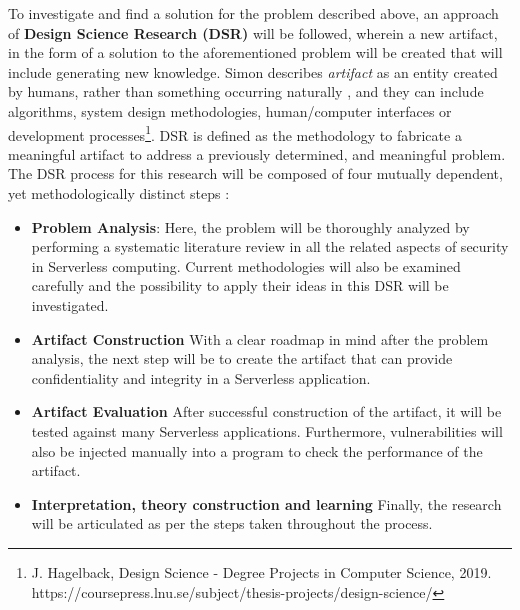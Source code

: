 To investigate and find a solution for the problem described above, an approach of \textbf{Design Science Research (DSR)} \cite{March1995} will be followed, wherein a new artifact, in the form of a solution to the aforementioned problem will be created that will include generating new knowledge. Simon describes \textit{artifact} as an entity created by humans, rather than something occurring naturally \cite{Simon1996}, and they can include algorithms, system design methodologies, human/computer interfaces or development processes\footnote{J. Hagelback, Design Science - Degree Projects in Computer Science, 2019. https://coursepress.lnu.se/subject/thesis-projects/design-science/}. DSR is defined as the methodology to fabricate a meaningful artifact to address a previously determined, and meaningful problem\cite{Nunamaker1990}. The DSR process for this research will be composed of four mutually dependent, yet methodologically distinct steps \cite{Mettler2014}:
\begin{itemize}
	\item \textbf{Problem Analysis}: Here, the problem will be thoroughly analyzed by performing a systematic literature review in all the related aspects of security in Serverless computing. Current methodologies will also be examined carefully and the possibility to apply their ideas in this DSR will be investigated.
	\item \textbf{Artifact Construction} With a clear roadmap in mind after the problem analysis, the next step will be to create the artifact that can provide confidentiality and integrity in a Serverless application.
	\item \textbf{Artifact Evaluation} After successful construction of the artifact, it will be tested against many Serverless applications. Furthermore, vulnerabilities will also be injected manually into a program to check the performance of the artifact.
	\item \textbf{Interpretation, theory construction and learning} Finally, the research will be articulated as per the steps taken throughout the process.
\end{itemize}